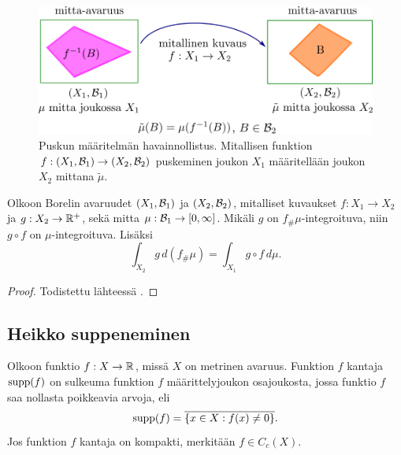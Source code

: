\documentclass[12pt,oneside,a4paper]{amsbook} %
\begin{document}
\begin{figure}
    \centering
    \includegraphics[scale=0.4]{graphics/push-forward.png}
    \caption{Puskun määritelmän havainnollistus. Mitallisen funktion $f: (X_1, \mathcal{B}_1) \to (X_2, \mathcal{B}_2)$ puskeminen joukon $X_1$ määritellään joukon $X_2$ mittana $\tilde \mu$.}
    \label{fig:push-forward}
\end{figure}

\begin{theorem}\label{thm:push-cov}
    Olkoon Borelin avaruudet $(X_1, \mathcal{B}_1)$ ja $(X_2, \mathcal{B}_2)$, mitalliset kuvaukset $f: X_1 \to X_2$ ja $g: X_2 \to \mathbb{R}^+$, sekä mitta $\mu:\mathcal{B}_1 \to [0, \infty]$. Mikäli $g$ on $f_\#\mu$-integroituva, niin  $g \circ f$ on $\mu$-integroituva. Lisäksi
    \begin{equation*}
        \int_{X_2} g \, d(f_{\#} \mu) = \int_{X_1} g \circ f \, d\mu.
    \end{equation*}
\end{theorem}
\begin{proof}
Todistettu lähteessä \cite[s. 190]{bogachev}.
\end{proof}



\subsection{Heikko suppeneminen} 

\begin{definition}
    Olkoon funktio $f:X \to \mathbb{R}$, missä $X$ on metrinen avaruus. Funktion $f$ kantaja $\operatorname{supp}(f)$ on sulkeuma funktion $f$ määrittelyjoukon osajoukosta, jossa funktio $f$ saa nollasta poikkeavia arvoja, eli
    \begin{equation*}
        \operatorname{supp}(f) = \overline{\{x \in X : f(x) \ne 0\}}.
    \end{equation*}
     Jos funktion $f$ kantaja on kompakti, merkitään $f \in C_c(X)$.
\end{definition}
\end{document}
